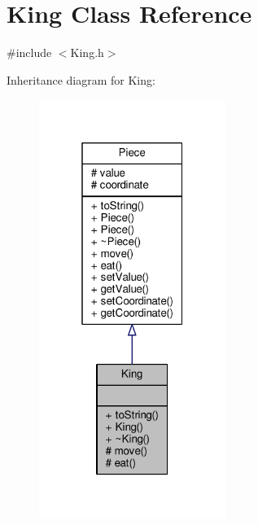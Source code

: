 \hypertarget{class_king}{}\section{King Class Reference}
\label{class_king}


{\ttfamily \#include $<$King.\+h$>$}



Inheritance diagram for King\+:\nopagebreak
\begin{figure}[H]
\begin{center}
\leavevmode
\includegraphics[width=172pt]{class_king__inherit__graph}
\end{center}
\end{figure}


